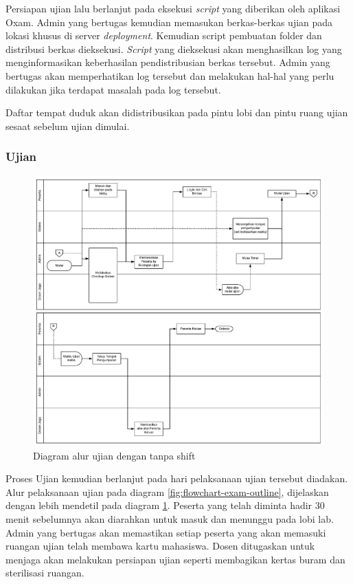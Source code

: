         Persiapan ujian lalu berlanjut pada eksekusi \textit{script} yang diberikan oleh aplikasi Oxam. Admin yang bertugas kemudian memasukan berkas-berkas ujian pada lokasi khusus di server \textit{deployment}. Kemudian script pembuatan folder dan distribusi berkas dieksekusi. \textit{Script} yang dieksekusi akan menghasilkan log yang menginformasikan keberhasilan pendistribusian berkas tersebut. Admin yang bertugas akan memperhatikan log tersebut dan melakukan hal-hal yang perlu dilakukan jika terdapat masalah pada log tersebut.
        
        Daftar tempat duduk akan didistribusikan pada pintu lobi dan pintu ruang ujian sesaat sebelum ujian dimulai.
    
    \subsubsection{Ujian}
        \begin{figure}
            \centering
            \includegraphics[width=0.75\paperwidth]{Gambar/flowchart/exam-flow-ujian-no-shift.pdf}
            \caption{Diagram alur ujian dengan tanpa shift}
            \label{fig:flowchart-exam-exam-noshift}
        \end{figure}
        Proses Ujian kemudian berlanjut pada hari pelaksanaan ujian tersebut diadakan. Alur pelaksanaan ujian pada diagram \ref{fig:flowchart-exam-outline}, dijelaskan dengan lebih mendetil pada diagram \ref{fig:flowchart-exam-exam-noshift}. Peserta yang telah diminta hadir 30 menit sebelumnya akan diarahkan untuk masuk dan menunggu pada lobi lab. Admin yang bertugas akan memastikan setiap peserta yang akan memasuki ruangan ujian telah membawa kartu mahasiswa.
        Dosen ditugaskan untuk menjaga akan melakukan persiapan ujian seperti membagikan kertas buram dan sterilisasi ruangan.
        
